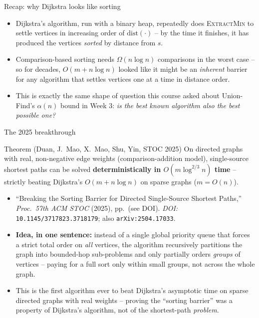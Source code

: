 \documentclass[11pt,aspectratio=169]{beamer}
\begin{document}
\begin{frame}{Recap: why Dijkstra looks like sorting}
  \begin{itemize}
    \item Dijkstra's algorithm, run with a binary heap, repeatedly does
    \textsc{ExtractMin} to settle vertices in increasing order of
    $\mathrm{dist}(\cdot)$ -- by the time it finishes, it has produced the
    vertices \emph{sorted} by distance from $s$.
    \item Comparison-based sorting needs $\Omega(n\log n)$ comparisons in the
    worst case -- so for decades, $O(m+n\log n)$ looked like it might be an
    \emph{inherent} barrier for any algorithm that settles vertices one at a
    time in distance order.
    \item This is exactly the same shape of question this course asked about
    Union-Find's $\alpha(n)$ bound in Week 3: \emph{is the best known algorithm
    also the best possible one?}
  \end{itemize}
\end{frame}

\begin{frame}{The 2025 breakthrough}
  \begin{block}{Theorem (Duan, J.~Mao, X.~Mao, Shu, Yin, STOC 2025)}
    On directed graphs with real, non-negative edge weights (comparison-addition
    model), single-source shortest paths can be solved
    \textbf{deterministically in $O(m\log^{2/3} n)$ time} -- strictly beating
    Dijkstra's $O(m+n\log n)$ on sparse graphs ($m = O(n)$).
  \end{block}
  \begin{itemize}
    \item ``Breaking the Sorting Barrier for Directed Single-Source Shortest
    Paths,'' \emph{Proc.\ 57th ACM STOC} (2025), pp.\ (see DOI). \emph{DOI:}
    \texttt{10.1145/3717823.3718179}; also \texttt{arXiv:2504.17033}.
    \item \textbf{Idea, in one sentence:} instead of a single global priority
    queue that forces a strict total order on \emph{all} vertices, the algorithm
    recursively partitions the graph into bounded-hop sub-problems and only
    partially orders \emph{groups} of vertices -- paying for a full sort only
    within small groups, not across the whole graph.
    \item This is the first algorithm ever to beat Dijkstra's asymptotic time on
    sparse directed graphs with real weights -- proving the ``sorting barrier''
    was a property of Dijkstra's algorithm, not of the shortest-path
    \emph{problem}.
  \end{itemize}
\end{frame}
\end{document}
